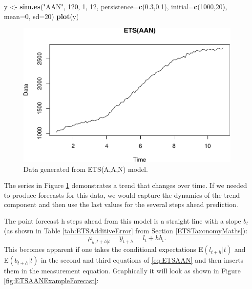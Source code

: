 \documentclass[]{book}
\newenvironment{Shaded}{\begin{snugshade}}{\end{snugshade}}
\newcommand{\DataTypeTok}[1]{\textcolor[rgb]{0.13,0.29,0.53}{#1}}
\newcommand{\DecValTok}[1]{\textcolor[rgb]{0.00,0.00,0.81}{#1}}
\newcommand{\FloatTok}[1]{\textcolor[rgb]{0.00,0.00,0.81}{#1}}
\newcommand{\KeywordTok}[1]{\textcolor[rgb]{0.13,0.29,0.53}{\textbf{#1}}}
\newcommand{\NormalTok}[1]{#1}
\newcommand{\StringTok}[1]{\textcolor[rgb]{0.31,0.60,0.02}{#1}}
\theoremstyle{definition}
\theoremstyle{definition}
\theoremstyle{definition}
\theoremstyle{definition}
\theoremstyle{remark}
\begin{document}
\begin{Shaded}
\begin{Highlighting}[]
\NormalTok{y <-}\StringTok{ }\KeywordTok{sim.es}\NormalTok{(}\StringTok{"AAN"}\NormalTok{, }\DecValTok{120}\NormalTok{, }\DecValTok{1}\NormalTok{, }\DecValTok{12}\NormalTok{, }\DataTypeTok{persistence=}\KeywordTok{c}\NormalTok{(}\FloatTok{0.3}\NormalTok{,}\FloatTok{0.1}\NormalTok{),}
            \DataTypeTok{initial=}\KeywordTok{c}\NormalTok{(}\DecValTok{1000}\NormalTok{,}\DecValTok{20}\NormalTok{), }\DataTypeTok{mean=}\DecValTok{0}\NormalTok{, }\DataTypeTok{sd=}\DecValTok{20}\NormalTok{)}
\KeywordTok{plot}\NormalTok{(y)}
\end{Highlighting}
\end{Shaded}

\begin{figure}
\centering
\includegraphics{Svetunkov--2022----ADAM_files/figure-latex/ETSAANExample-1.pdf}
\caption{\label{fig:ETSAANExample}Data generated from ETS(A,A,N) model.}
\end{figure}

The series in Figure \ref{fig:ETSAANExample} demonstrates a trend that changes over time. If we needed to produce forecasts for this data, we would capture the dynamics of the trend component and then use the last values for the several steps ahead prediction.

The point forecast h steps ahead from this model is a straight line with a slope \(b_t\) (as shown in Table \ref{tab:ETSAdditiveError} from Section \ref{ETSTaxonomyMaths}):
\begin{equation}
    \mu_{y,t+h|t} = \hat{y}_{t+h} = l_{t} + h b_t.
  \label{eq:ETSAANForecast}
\end{equation}
This becomes apparent if one takes the conditional expectations E\((l_{t+h}|t)\) and E\((b_{t+h}|t)\) in the second and third equations of \eqref{eq:ETSAAN} and then inserts them in the measurement equation. Graphically it will look as shown in Figure \ref{fig:ETSAANExampleForecast}:
\end{document}
